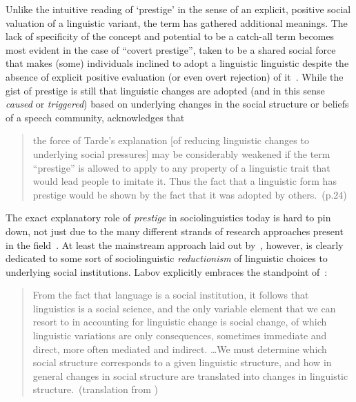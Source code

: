 Unlike the intuitive reading of `prestige' in the sense of an explicit, positive social valuation of a linguistic variant, the term has gathered additional meanings. The lack of specificity of the concept and potential to be a catch-all term becomes most evident in the case of ``covert prestige'', taken to be a shared social force that makes (some) individuals inclined to adopt a linguistic linguistic despite the absence of explicit positive evaluation (or even overt rejection) of it~\citep[p.108, see also \citealt{Labov1972}]{Labov1966a}.
While the gist of prestige is still that linguistic changes are adopted (and in this sense \emph{caused} or \emph{triggered}) based on underlying changes in the social structure or beliefs of a speech community, \citet{Labov2001} acknowledges that

\begin{quote}
the force of Tarde's explanation [of reducing linguistic changes to underlying social pressures] may be considerably weakened if the term ``prestige'' is allowed to apply to any property of a linguistic trait that would lead people to imitate it. Thus the fact that a linguistic form has prestige would be shown by the fact that it was adopted by others.~(p.24)
\end{quote}


The exact explanatory role of \emph{prestige} in sociolinguistics today is hard to pin down, not just due to the many different strands of research approaches present in the field~\citep{Tagliamonte2015}. At least the mainstream approach laid out by~\citet{Labov2001}, however, is clearly dedicated to some sort of sociolinguistic \emph{reductionism} of linguistic choices to underlying social institutions. Labov explicitly embraces the standpoint of~\citet{Meillet1926}:

\begin{quote}
From the fact that language is a social institution, it follows that linguistics is a social science, and the only variable element that we can resort to in accounting for linguistic change is social change, of which linguistic variations are only consequences, sometimes immediate and direct, more often mediated and indirect. \ldots We must determine which social structure corresponds to a given linguistic structure, and how in general changes in social structure are translated into changes in linguistic structure.~(translation from \citealt[p.22-23]{Labov2001})
\end{quote}

